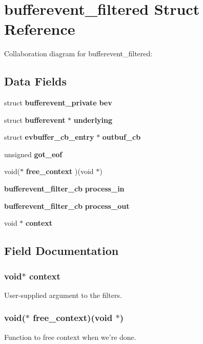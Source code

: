\section{bufferevent\-\_\-filtered \-Struct \-Reference}
\label{structbufferevent__filtered}


\-Collaboration diagram for bufferevent\-\_\-filtered\-:
\subsection*{\-Data \-Fields}
\begin{DoxyCompactItemize}
\item 
struct {\bf bufferevent\-\_\-private} {\bfseries bev}\label{structbufferevent__filtered_ac89d86467e491d6accc55fc1aaea8a13}

\item 
struct {\bf bufferevent} $\ast$ {\bf underlying}
\item 
struct {\bf evbuffer\-\_\-cb\-\_\-entry} $\ast$ {\bf outbuf\-\_\-cb}
\item 
unsigned {\bf got\-\_\-eof}
\item 
void($\ast$ {\bf free\-\_\-context} )(void $\ast$)
\item 
{\bf bufferevent\-\_\-filter\-\_\-cb} {\bf process\-\_\-in}
\item 
{\bf bufferevent\-\_\-filter\-\_\-cb} {\bf process\-\_\-out}
\item 
void $\ast$ {\bf context}
\end{DoxyCompactItemize}


\subsection{\-Field \-Documentation}
\subsubsection[{context}]{\setlength{\rightskip}{0pt plus 5cm}void$\ast$ {\bf context}}\label{structbufferevent__filtered_ae376f130b17d169ee51be68077a89ed0}
\-User-\/supplied argument to the filters. 
\subsubsection[{free\-\_\-context}]{\setlength{\rightskip}{0pt plus 5cm}void($\ast$ {\bf free\-\_\-context})(void $\ast$)}\label{structbufferevent__filtered_ab0a3809972d3b1423631e37f9440491f}
\-Function to free context when we're done. 
